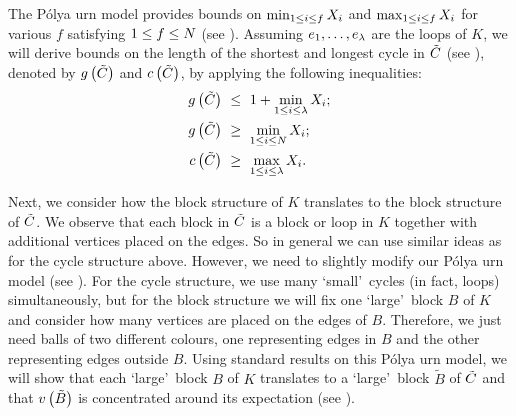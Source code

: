 The P\'olya urn model provides bounds on $\min_{1\leq i \leq f} X_i$ and $\max_{1\leq i \leq f} X_i$ for various $f$ satisfying $1\leq f \leq N$ (see ). Assuming $e_1, \ldots, e_{\lambda}$ are the loops of $K$, we will derive bounds on the length of the shortest and longest cycle in $\tilde{C}$ (see ), denoted by $g\left({\tilde{C}}\right)$ and $c\left({\tilde{C}}\right)$, by applying the following inequalities:
\begin{align}
g\left({\tilde{C}}\right)&\ \leq\ 1+\min_{1\leq i \leq \lambda}X_i; \label{CBbound1}
\\
g\left({\tilde{C}}\right)&\ \geq\ \min_{1\leq i \leq N}X_i; \label{CBbound2}
\\
c\left({\tilde{C}}\right)&\ \geq\ \max_{1\leq i \leq \lambda}X_i. \label{CBbound3}
\end{align}

Next, we consider how the block structure of $K$ translates to the block structure of $\tilde{C}$. We observe that each block in $\tilde{C}$ is a block or loop in $K$ together with additional vertices placed on the edges. So in general we can use similar ideas as for the cycle structure above. However, we need to slightly modify our P\'olya urn model (see ). For the cycle structure, we use many \lq small\rq\ cycles (in fact, loops) simultaneously, but for the block structure we will fix one \lq large\rq\ block $B$ of $K$ and consider how many vertices are placed on the edges of $B$. Therefore, we just need balls of two different colours, one representing edges in $B$ and the other representing edges outside $B$. Using standard results on this P\'olya urn model, we will show that each \lq large\rq\ block $B$ of $K$ translates to a \lq large\rq\ block $\tilde{B}$ of $\tilde{C}$ and that $v\left({\tilde{B}}\right)$ is concentrated around its expectation (see ). 

